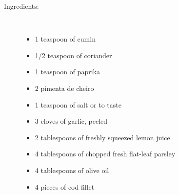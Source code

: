 \documentclass[11pt,letterpaper]{article}
\begin{document}
\begin{description}

\item[Ingredients:]\ \\
	\begin{itemize}
	\item 1 teaspoon of cumin 
	\item 1/2 teaspoon of coriander
	\item 1 teaspoon of paprika
	\item 2 pimenta de cheiro
	\item 1 teaspoon of salt or to taste
	\item 3 cloves of garlic, peeled
	\item 2 tablespoons of freshly squeezed lemon juice
	\item 4 tablespoons of chopped fresh flat-leaf parsley
	\item 4 tablespoons of olive oil
	\item 4 pieces of cod fillet
	\end{itemize}


\end{description}
\end{document}
